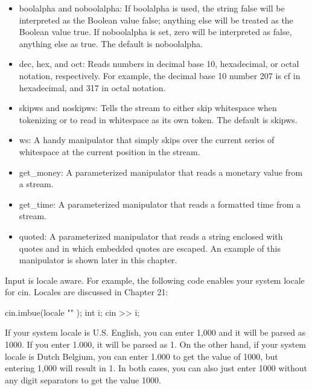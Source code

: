 \begin{itemize}
\item
boolalpha and noboolalpha: If boolalpha is used, the string false will be interpreted as the Boolean value false; anything else will be treated as the Boolean value true. If noboolalpha is set, zero will be interpreted as false, anything else as true. The default is noboolalpha.

\item
dec, hex, and oct: Reads numbers in decimal base 10, hexadecimal, or octal notation, respectively. For example, the decimal base 10 number 207 is cf in hexadecimal, and 317 in octal notation.

\item
skipws and noskipws: Tells the stream to either skip whitespace when tokenizing or to read in whitespace as its own token. The default is skipws.

\item
ws: A handy manipulator that simply skips over the current series of whitespace at the current position in the stream.

\item
get\_money: A parameterized manipulator that reads a monetary value from a stream.

\item
get\_time: A parameterized manipulator that reads a formatted time from a stream.

\item
quoted: A parameterized manipulator that reads a string enclosed with quotes and in which embedded quotes are escaped. An example of this manipulator is shown later in this chapter.
\end{itemize}

Input is locale aware. For example, the following code enables your system locale for cin. Locales are discussed in Chapter 21:

\begin{cpp}
cin.imbue(locale { "" });
int i;
cin >> i;
\end{cpp}

If your system locale is U.S. English, you can enter 1,000 and it will be parsed as 1000. If you enter 1.000, it will be parsed as 1. On the other hand, if your system locale is Dutch Belgium, you can enter 1.000 to get the value of 1000, but entering 1,000 will result in 1. In both cases, you can also just enter 1000 without any digit separators to get the value 1000.


